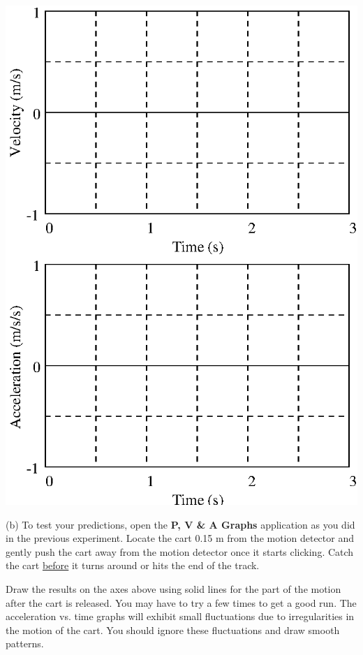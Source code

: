 \vspace{0.3cm}
{\par\centering \includegraphics{slowing/slowing_fig1.eps} \par}
\vspace{0.3cm}

(b) To test your predictions, open the \textbf{P, V \& A Graphs} application as you did in the previous experiment. Locate the cart 0.15 m from the motion detector and gently push the cart away from the motion detector once it starts clicking. Catch the cart \underline{before} it turns around or hits the end of the track.

Draw the results on the axes above using solid lines for the part of the motion
after the cart is released. You may have to try a few times to get a good run.  The acceleration vs. time graphs will exhibit small fluctuations due to irregularities in the motion of the cart. You should ignore these fluctuations and draw smooth patterns.

